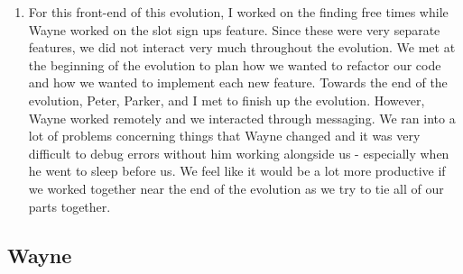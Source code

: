 \documentclass[11pt]{article}   %
\begin{document}
\begin{enumerate} [a)]
\begin{enumerate} [$\cdot$]
\item For this front-end of this evolution, I worked on the finding free times while Wayne worked on the slot sign ups feature. Since these were very separate features, we did not interact very much throughout the evolution. We met at the beginning of the evolution to plan how we wanted to refactor our code and how we wanted to implement each new feature. Towards the end of the evolution, Peter, Parker, and I met to finish up the evolution. However, Wayne worked remotely and we interacted through messaging. We ran into a lot of problems concerning things that Wayne changed and it was very difficult to debug errors without him working alongside us - especially when he went to sleep before us. We feel like it would be a lot more productive if we worked together near the end of the evolution as we try to tie all of our parts together.
\end{enumerate}
\end{enumerate}
\subsection*{Wayne}
\end{document}
